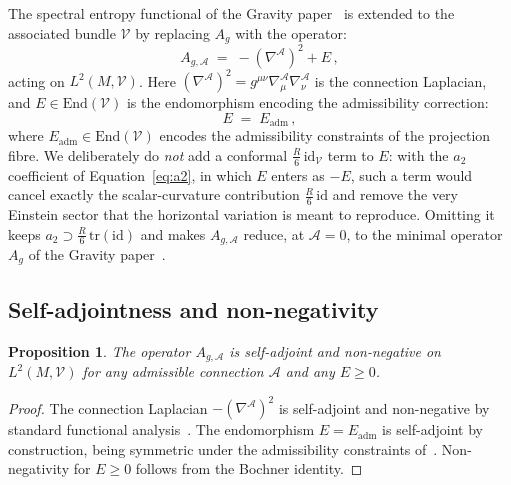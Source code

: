 \documentclass[12pt,a4paper]{article}
\theoremstyle{remark}
\theoremstyle{plain}
\newtheorem{proposition}{Proposition}
\theoremstyle{definition}
\begin{document}
      The spectral entropy functional of the Gravity
      paper~\cite{Beau2026h} is extended to the associated
      bundle $\mathcal{V}$ by replacing $A_g$ with the operator:
      \begin{equation}\label{eq:total-operator}
        A_{g,\mathcal{A}}
        \;=\;
        -(\nabla^\mathcal{A})^2 + E\,,
      \end{equation}
      acting on $L^2(M, \mathcal{V})$.
      Here $(\nabla^\mathcal{A})^2
  = g^{\mu\nu}\nabla^\mathcal{A}_\mu \nabla^\mathcal{A}_\nu$
      is the connection Laplacian, and $E \in \mathrm{End}(\mathcal{V})$
      is the endomorphism encoding the admissibility correction:
      \begin{equation}\label{eq:endomorphism}
        E
        \;=\;
        E_{\mathrm{adm}}\,,
      \end{equation}
      where $E_{\mathrm{adm}} \in \mathrm{End}(\mathcal{V})$ encodes
      the admissibility constraints of the projection fibre.
      We deliberately do \emph{not} add a conformal
      $\tfrac{R}{6}\,\mathrm{id}_\mathcal{V}$ term to $E$: with the
      $a_2$ coefficient of Equation~\eqref{eq:a2}, in which $E$ enters
      as $-E$, such a term would cancel exactly the scalar-curvature
      contribution $\tfrac{R}{6}\,\mathrm{id}$ and remove the very
      Einstein sector that the horizontal variation is meant to
      reproduce. Omitting it keeps
      $a_2 \supset \tfrac{R}{6}\,\mathrm{tr}(\mathrm{id})$ and makes
      $A_{g,\mathcal{A}}$ reduce, at $\mathcal{A}=0$, to the minimal
      operator $A_g$ of the Gravity paper~\cite{Beau2026h}.

    \subsection{Self-adjointness and non-negativity}
      \label{subsec:selfadjoint}

      \begin{proposition}
        \label{prop:self-adjoint}
        The operator $A_{g,\mathcal{A}}$ is self-adjoint and
        non-negative on $L^2(M, \mathcal{V})$ for any admissible
        connection $\mathcal{A}$ and any $E \geq 0$.
      \end{proposition}

      \begin{proof}
        The connection Laplacian $-(\nabla^\mathcal{A})^2$ is
        self-adjoint and non-negative by standard functional
        analysis~\cite{ParkerToms2009}.
        The endomorphism $E = E_{\mathrm{adm}}$ is self-adjoint by
        construction, being symmetric under the admissibility
        constraints of~\cite{Beau2026m}.
        Non-negativity for $E \geq 0$ follows from the Bochner identity.
      \end{proof}
\end{document}

